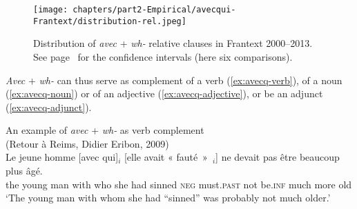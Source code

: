 \begin{figure}
    \centering
    \texttt{[image: chapters/part2-Empirical/avecqui-Frantext/distribution-rel.jpeg]}
    \caption[Distribution of \emph{avec} + \emph{wh-} relative clauses in Frantext 2000--2013]{Distribution of \emph{avec} + \emph{wh-} relative clauses in Frantext 2000--2013. See page~\pageref{ch:conf-intervals-binomial} for the confidence intervals (here six comparisons).}
    \label{fig:avecq}
\end{figure}

\emph{Avec} + \emph{wh-} can thus serve as complement of a verb (\ref{ex:avecq-verb}), of a noun (\ref{ex:avecq-noun}) or of an adjective (\ref{ex:avecq-adjective}), or be an adjunct (\ref{ex:avecq-adjunct}). 

\ea An example of \emph{avec} + \emph{wh-} as verb complement\\
(Retour à Reims, Didier Eribon, 2009)\nopagebreak\\
\gll Le jeune homme [avec qui]$_i$ [elle avait « fauté~»~\trace{}$_i$] ne devait pas être beaucoup plus âgé.\\
the young man with who she had {} sinned \textsc{neg} must\textsc{.past} not be\textsc{.inf} much more old\\
\glt `The young man with whom she had ``sinned'' was probably not much older.'
\label{ex:avecq-verb}
\z 

